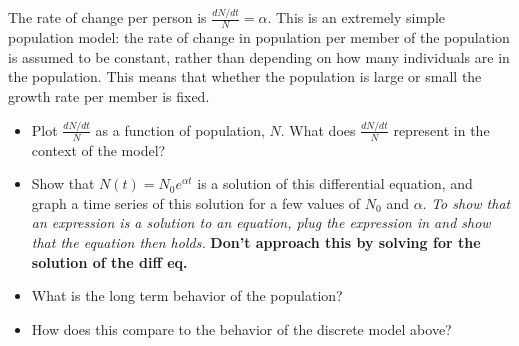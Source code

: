 \documentclass[12pt,letterpaper,noanswers]{exam}
\begin{document}
\begin{enumerate}
The rate of change per person is $\frac{dN/dt}{N} = \alpha$.  This is an extremely simple population model: the rate of change in population per member of the population is assumed to be constant, rather than depending on how many individuals are in the population.  This means that whether the population is large or small the growth rate per member is fixed.
\begin{itemize}
\item Plot $\frac{dN/dt}{N}$ as a function of population, $N$.  What does $\frac{dN/dt}{N}$ represent in the context of the model?  
\item Show that $N(t) = N_0 e^{\alpha t}$ is a solution of this differential equation, and graph a time series of this solution for a few values of $N_0$ and $\alpha$.  \emph{To show that an expression is a solution to an equation, plug the expression in and show that the equation then holds.}  \textbf{Don't approach this by solving for the solution of the diff eq.}
\item What is the long term behavior of the population?  
\item How does this compare to the behavior of the discrete model above?
\end{itemize}

\end{enumerate}
\end{document}
